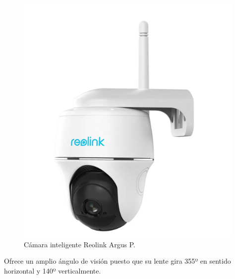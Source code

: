 \begin{enumerate}[label=\alph*)]
    \begin{figure}[H]
    \centering
    \begin{adjustbox}{width=\linewidth/2}
      \includegraphics{media/reolink.png}
    \end{adjustbox}
    \caption{\label{fig:ReolinkArgusP}Cámara inteligente Reolink Argus P.}
    \end{figure}

    Ofrece un amplio ángulo de visión puesto que su lente gira 355º en sentido horizontal y 140º verticalmente.
    
\end{enumerate}

\needspace{5cm}
